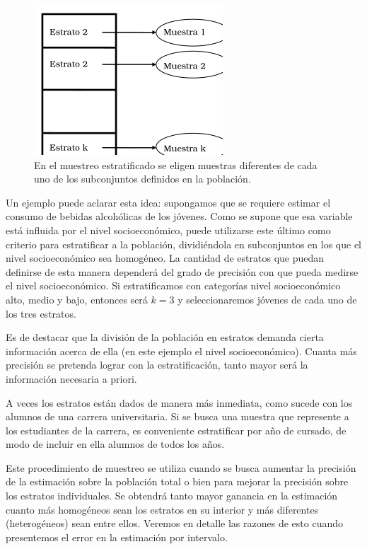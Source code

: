 \documentclass[]{book}
\begin{document}
\begin{figure}

{\centering \includegraphics{imagenes/image87} 

}

\caption{En el muestreo estratificado se eligen muestras diferentes de cada uno de los subconjuntos definidos en la población.}\label{fig:unnamed-chunk-202}
\end{figure}

Un ejemplo puede aclarar esta idea: supongamos que se requiere estimar
el consumo de bebidas alcohólicas de los jóvenes. Como se supone que esa
variable está influida por el nivel socioeconómico, puede utilizarse
este último como criterio para estratificar a la población, dividiéndola
en subconjuntos en los que el nivel socioeconómico sea homogéneo. La
cantidad de estratos que puedan definirse de esta manera dependerá del
grado de precisión con que pueda medirse el nivel socioeconómico. Si
estratificamos con categorías nivel socioeconómico alto, medio y bajo,
entonces será \(k=3\) y seleccionaremos jóvenes de cada uno de los tres
estratos.

Es de destacar que la división de la población en estratos demanda
cierta información acerca de ella (en este ejemplo el nivel
socioeconómico). Cuanta más precisión se pretenda lograr con la
estratificación, tanto mayor será la información necesaria a priori.

A veces los estratos están dados de manera más inmediata, como sucede
con los alumnos de una carrera universitaria. Si se busca una muestra
que represente a los estudiantes de la carrera, es conveniente
estratificar por año de cursado, de modo de incluir en ella alumnos de
todos los años.

Este procedimiento de muestreo se utiliza cuando se busca aumentar la
precisión de la estimación sobre la población total o bien para mejorar
la precisión sobre los estratos individuales. Se obtendrá tanto mayor
ganancia en la estimación cuanto más homogéneos sean los estratos en su
interior y más diferentes (heterogéneos) sean entre ellos. Veremos en
detalle las razones de esto cuando presentemos el error en la estimación
por intervalo.
\end{document}
